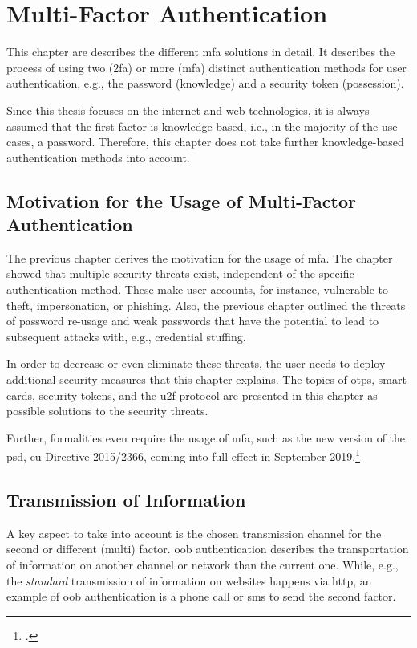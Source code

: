 \chapter{Multi-Factor Authentication}
\label{chap:mfa}

This chapter are describes the different \gls{mfa} solutions in detail. It describes the process of using two (\gls{2fa}) or more (\gls{mfa}) distinct authentication methods for user authentication, e.g., the password (knowledge) and a security token (possession).

Since this thesis focuses on the internet and web technologies, it is always assumed that the first factor is knowledge-based, i.e., in the majority of the use cases, a password. Therefore, this chapter does not take further knowledge-based authentication methods into account.

\section{Motivation for the Usage of Multi-Factor Authentication}

The previous chapter derives the motivation for the usage of \gls{mfa}. The chapter showed that multiple security threats exist, independent of the specific authentication method. These make user accounts, for instance, vulnerable to theft, impersonation, or phishing. Also, the previous chapter outlined the threats of password re-usage and weak passwords that have the potential to lead to subsequent attacks with, e.g., credential stuffing.

 In order to decrease or even eliminate these threats, the user needs to deploy additional security measures that this chapter explains. The topics of \glspl{otp}, smart cards, security tokens, and the \gls{u2f} protocol are presented in this chapter as possible solutions to the security threats.
 
 Further, formalities even require the usage of \gls{mfa}, such as the new version of the \gls{psd}, \gls{eu} Directive 2015/2366, coming into full effect in September 2019.\footcites[See][10]{NOCTOR20189}

\newpage

\section{Transmission of Information}

A key aspect to take into account is the chosen transmission channel for the second or different (multi) factor. \gls{oob} authentication describes the transportation of information on another channel or network than the current one. While, e.g., the \textit{standard} transmission of information on websites happens via \gls{http}, an example of \gls{oob} authentication is a phone call or \gls{sms} to send the second factor.


